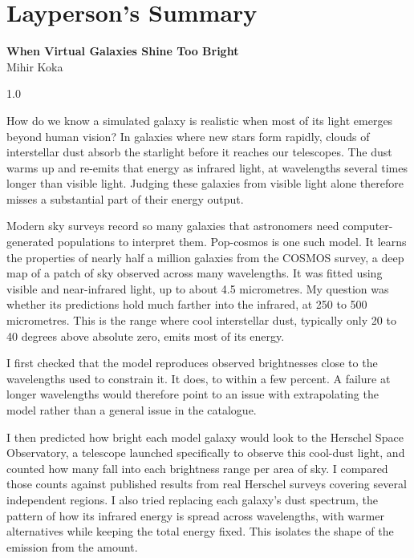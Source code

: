 \documentclass[12pt,a4paper]{article}
\begin{document}
\section*{\centering Layperson's Summary}
\vspace{-0.3cm}
\begin{center}
{\normalsize\bfseries When Virtual Galaxies Shine Too Bright}\\[2pt]
{\small Mihir Koka}
\end{center}
\begin{spacing}{1.0}

How do we know a simulated galaxy is realistic when most of its light emerges beyond
human vision? In galaxies where new stars form rapidly, clouds of interstellar
dust absorb the starlight before it reaches our telescopes. The dust warms up and
re-emits that energy as infrared light, at wavelengths several times
longer than visible light. Judging these galaxies from visible light alone therefore
misses a substantial part of their energy output.

Modern sky surveys record so many galaxies that astronomers need computer-generated
populations to interpret them. Pop-cosmos is one such model. It learns the
properties of nearly half a million galaxies from the COSMOS survey, a deep map of a
patch of sky observed across many wavelengths. It was fitted using visible and
near-infrared light, up to about 4.5 micrometres. My question was whether its
predictions hold much farther into the infrared, at 250 to 500 micrometres. This is
the range where cool interstellar dust, typically only 20 to 40 degrees above absolute
zero, emits most of its energy.

I first checked that the model reproduces observed brightnesses close to the
  wavelengths used to constrain it. It does, to within a few percent. A failure at
  longer wavelengths would therefore point to an issue with extrapolating the model rather than a
  general issue in the catalogue.

I then predicted how bright each model galaxy would look to the Herschel Space
Observatory, a telescope launched specifically to observe this cool-dust light, and
counted how many fall into each brightness range per area of sky. I compared those
counts against published results from real Herschel surveys covering several
independent regions. I also tried replacing each galaxy's dust spectrum, the pattern of how its infrared
energy is spread across wavelengths, with warmer alternatives while keeping the total
energy fixed. This isolates the shape of the emission from the amount.


\end{spacing}
\end{document}
